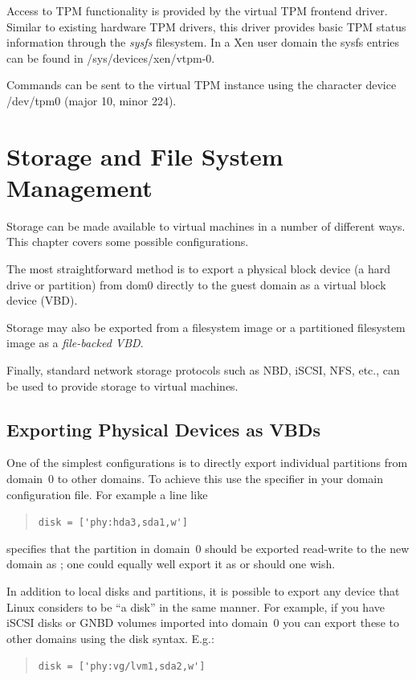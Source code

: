 \documentclass[11pt,twoside,final,openright]{report}
\begin{document}
Access to TPM functionality is provided by the virtual TPM frontend driver.
Similar to existing hardware TPM drivers, this driver provides basic TPM
status information through the {\it sysfs} filesystem. In a Xen user domain
the sysfs entries can be found in /sys/devices/xen/vtpm-0.

Commands can be sent to the virtual TPM instance using the character
device /dev/tpm0 (major 10, minor 224).

\chapter{Storage and File System Management}

Storage can be made available to virtual machines in a number of
different ways.  This chapter covers some possible configurations.

The most straightforward method is to export a physical block device (a
hard drive or partition) from dom0 directly to the guest domain as a
virtual block device (VBD).

Storage may also be exported from a filesystem image or a partitioned
filesystem image as a \emph{file-backed VBD}.

Finally, standard network storage protocols such as NBD, iSCSI, NFS,
etc., can be used to provide storage to virtual machines.


\section{Exporting Physical Devices as VBDs}
\label{s:exporting-physical-devices-as-vbds}

One of the simplest configurations is to directly export individual
partitions from domain~0 to other domains. To achieve this use the
 specifier in your domain configuration file. For example a
line like
\begin{quote}
  \verb_disk = ['phy:hda3,sda1,w']_
\end{quote}
specifies that the partition  in domain~0 should be
exported read-write to the new domain as ; one could
equally well export it as  or  should
one wish.

In addition to local disks and partitions, it is possible to export
any device that Linux considers to be ``a disk'' in the same manner.
For example, if you have iSCSI disks or GNBD volumes imported into
domain~0 you can export these to other domains using the 
disk syntax. E.g.:
\begin{quote}
  \verb_disk = ['phy:vg/lvm1,sda2,w']_
\end{quote}
\end{document}
